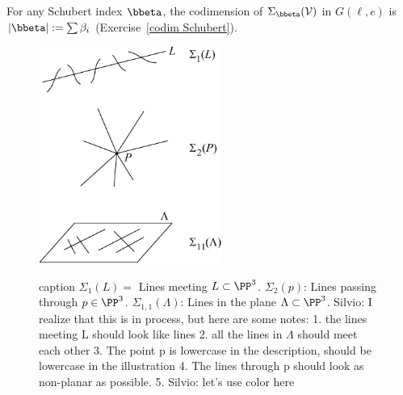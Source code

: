 For any Schubert index $\bbeta$, the codimension of $\Sigma_{\bbeta}({\cal V})$ in $G(\ell, e)$ is $|{\bbeta}|:= \sum \beta_i$
(Exercise~\ref{codim Schubert}).

%



\begin{figure}
\inprogress
\centerline {\includegraphics[height=2.8in]{"main/Fig12-2"}}
caption{
$\Sigma_{1}(L) =$ Lines meeting $L\subset\PP^3$.
$\Sigma_{2}(p)$: Lines passing through $p\in\PP^3$.
$\Sigma_{1,1}(\Lambda)$: Lines in the plane $\Lambda\subset \PP^3$.
{Silvio: I realize that this is in process, but here are some notes:
1. the lines meeting L should look like lines
2. all the lines in $\Lambda$ should meet each other
3. The point p is lowercase in the description, should be lowercase in the illustration
4. The lines through p should look as non-planar as possible.
5. {Silvio: let's use color here}}}
\label{Schubert cycles in G(2,4).}\end{figure}

